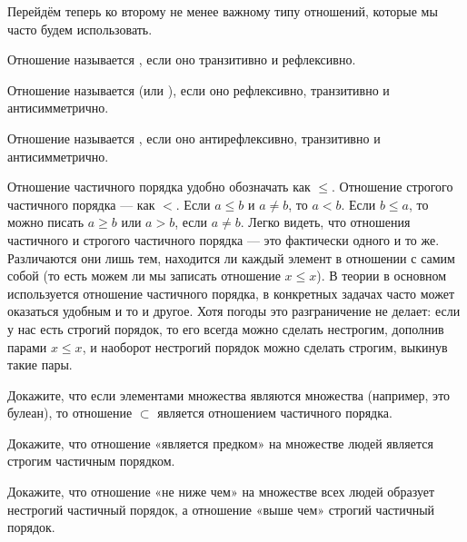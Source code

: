 Перейдём теперь ко второму не менее важному типу отношений, которые мы часто будем использовать.

\begin{definition}
	Отношение называется , если оно транзитивно и рефлексивно.
\end{definition}

\begin{definition}
Отношение называется  (или ), если оно рефлексивно, транзитивно и антисимметрично.
\end{definition}

\begin{definition}
Отношение называется , если оно антирефлексивно, транзитивно и антисимметрично.
\end{definition}

Отношение частичного порядка удобно обозначать как $\le$. Отношение строгого частичного порядка — как $<$. Если $a \le b$ и $a \not= b$, то $a<b$. Если $b \le a$, то можно писать $a \ge b$ или $a > b$, если $a\not= b$. Легко видеть, что отношения частичного и строгого частичного порядка — это фактически одного и то же. Различаются они лишь тем, находится ли каждый элемент в отношении с самим собой (то есть можем ли мы записать отношение $x\le x$). В теории в основном используется отношение частичного порядка, в конкретных задачах часто может оказаться удобным и то и другое. Хотя погоды это разграничение не делает: если у нас есть строгий порядок, то его всегда можно сделать нестрогим, дополнив парами $x\le x$, и наоборот нестрогий порядок можно сделать строгим, выкинув такие пары.

\begin{exercise}
Докажите, что если элементами множества являются множества (например, это булеан), то отношение $\subset$ является отношением частичного порядка.
\end{exercise}

\begin{exercise}
Докажите, что отношение «является предком» на множестве людей является строгим частичным порядком.
\end{exercise}

\begin{exercise}
Докажите, что отношение «не ниже чем» на множестве всех людей образует нестрогий частичный порядок, а отношение «выше чем» строгий частичный порядок.
\end{exercise}

